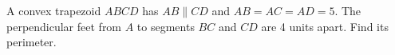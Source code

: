 A convex trapezoid $ ABCD $ has $ AB\parallel CD $ and $ AB=AC=AD=5 $. The perpendicular feet from $ A $ to segments $ BC $ and $ CD $ are 4 units apart. Find its perimeter.
